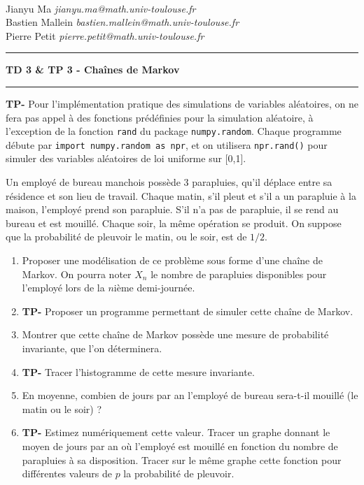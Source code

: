 \documentclass[solutions]{exercices}
\begin{document}
{
\\
Jianyu Ma \hfill \textit{jianyu.ma@math.univ-toulouse.fr}\\
Bastien Mallein \hfill \textit{bastien.mallein@math.univ-toulouse.fr}\\
Pierre Petit \hfill \textit{pierre.petit@math.univ-toulouse.fr}}

\vspace{2ex}

\hrule
\begin{center}
	\textbf{\large TD 3 \& TP 3 - Chaînes de Markov}
	\vspace{2ex}
\end{center}
\hrule

\bigskip

\textbf{TP-} Pour l'implémentation pratique des simulations de variables aléatoires, on ne fera pas appel à des fonctions prédéfinies pour la simulation aléatoire, à l'exception de la fonction \texttt{rand} du package \texttt{numpy.random}. Chaque programme débute par \texttt{import numpy.random as npr}, et on utilisera \texttt{npr.rand()} pour simuler des variables aléatoires de loi uniforme sur [0,1].

\begin{exercice}
	Un employé de bureau manchois possède 3 parapluies, qu'il déplace entre sa résidence et son lieu de travail. Chaque matin, s'il pleut et s'il a un parapluie à la maison, l'employé prend son parapluie. S'il n'a pas de parapluie, il se rend au bureau et est mouillé. Chaque soir, la même opération se produit. On suppose que la probabilité de pleuvoir le matin, ou le soir, est de $1/2$.
	\begin{enumerate}
		\item Proposer une modélisation de ce problème sous forme d'une chaîne de Markov. On pourra noter $X_n$ le nombre de parapluies disponibles pour l'employé lors de la $n$ième demi-journée.
		\item \textbf{TP-} Proposer un programme permettant de simuler cette chaîne de Markov.
		\item Montrer que cette chaîne de Markov possède une mesure de probabilité invariante, que l'on déterminera.
		\item \textbf{TP-} Tracer l'histogramme de cette mesure invariante.
		\item En moyenne, combien de jours par an l'employé de bureau sera-t-il mouillé (le matin ou le soir) ?
		\item \textbf{TP-} Estimez numériquement cette valeur. Tracer un graphe donnant le moyen de jours par an où l'employé est mouillé en fonction du nombre de parapluies à sa disposition. Tracer sur le même graphe cette fonction pour différentes valeurs de $p$ la probabilité de pleuvoir.
	\end{enumerate}
\end{exercice}
\end{document}

